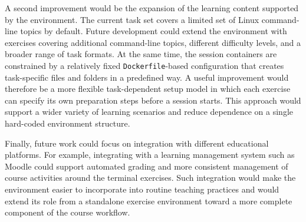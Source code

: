 A second improvement would be the expansion of the learning content supported by the environment.
The current task set covers a limited set of Linux command-line topics by default.
Future development could extend the environment with exercises covering additional command-line topics, different difficulty levels, and a broader range of task formats.
At the same time, the session containers are constrained by a relatively fixed \texttt{Dockerfile}-based configuration that creates task-specific files and folders in a predefined way.
A useful improvement would therefore be a more flexible task-dependent setup model in which each exercise can specify its own preparation steps before a session starts.
This approach would support a wider variety of learning scenarios and reduce dependence on a single hard-coded environment structure.

Finally, future work could focus on integration with different educational platforms.
For example, integrating with a learning management system such as Moodle could support automated grading and more consistent management of course activities around the terminal exercises.
Such integration would make the environment easier to incorporate into routine teaching practices and would extend its role from a standalone exercise environment toward a more complete component of the course workflow.
